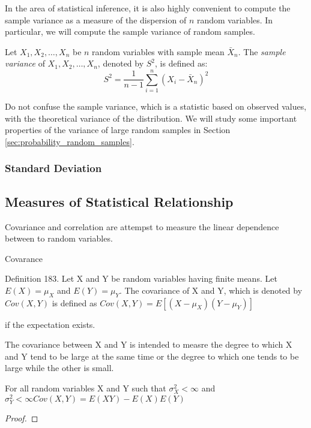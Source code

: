 In the area of statistical inference, it is also highly convenient to compute the sample variance as a measure of the dispersion of $n$ random variables. In particular, we will compute the sample variance of random samples.

\begin{definition}
Let $X_1, X_2, \ldots, X_n$ be $n$ random variables with sample mean $\bar{X}_n$. The \emph{sample variance} of $X_1, X_2, \ldots, X_n$, denoted by $S^2$, is defined as:
\[
S^2 = \frac{1}{n-1} \sum_{i=1}^n (X_i - \bar{X}_n)^2
\]
\end{definition}

Do not confuse the sample variance, which is a statistic based on observed values, with the theoretical variance of the distribution. We will study some important properties of the variance of large random samples in Section \ref{sec:probability_random_samples}.



\subsubsection*{Standard Deviation}

%
%

\subsection{Measures of Statistical Relationship}



Covariance and correlation are attempst to measure the linear dependence between to random variables.

Covarance

\begin{definition}
Definition 183. Let X and Y be random variables having finite means. Let $E\left(X\right)=\mu_{X}$ and $E\left(Y\right)=\mu_{Y}$. The covariance of X and Y, which is denoted by $Cov\left(X,Y\right)$ is defined as $Cov\left(X,Y\right)=E\left[\left(X-\mu_{X}\right)\left(Y-\mu_{Y}\right)\right]$
\end{definition}

if the expectation exists.

The covariance between X and Y is intended to measre the degree to which X and Y tend to be large at the same time or the degree to which one tends to be large while the other is small.

\begin{proposition}
For all random variables X and Y such that $\sigma_{X}^{2}<\infty$ and $\sigma_{Y}^{2}<\infty Cov\left(X,Y\right)=E\left(XY\right)-E\left(X\right)E\left(Y\right)$
\end{proposition}
\begin{proof}
\end{proof}

